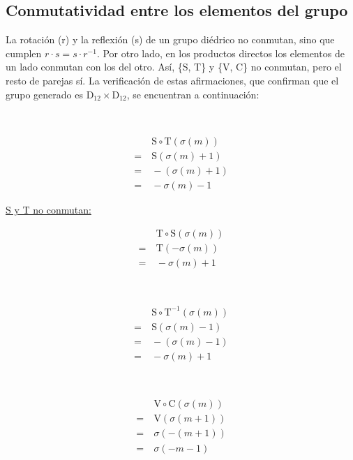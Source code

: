	\subsection{Conmutatividad entre los elementos del grupo}		
		La rotaci\'on (r) y la reflexi\'on (s) de un grupo di\'edrico no conmutan, sino que cumplen $r\cdot s=s\cdot r^{-1}$. Por otro lado, en los productos directos los elementos de un lado conmutan con los del otro. As\'i, \{S, T\} y \{V, C\} no conmutan, pero el resto de parejas s\'i. La verificaci\'on de estas afirmaciones, que confirman que el grupo generado es D$_{12}\times\mbox{D}_{12}$, se encuentran %
		a continuaci\'on:
			\begin{center}
			\begin{multicols}{3}
				\ \linebreak
				
				\begin{align*}
				&\ \text{S}\circ\text{T}(\sigma(m))\\
				=&\ \text{S}(\sigma(m)+1)\\
				=&\ -(\sigma(m)+1)\\
				=&\ -\sigma(m)-1
				\end{align*}
				
				\underline{S y T no conmutan:}
				
				\begin{align*}
				&\ \text{T}\circ\text{S}(\sigma(m))\\
				=&\ \text{T}(-\sigma(m))\\
				=&\ -\sigma(m)+1
				\end{align*}			
				
				\ \linebreak
				
				\begin{align*}
				&\ \text{S}\circ\text{T}^{-1}(\sigma(m))\\
				=&\ \text{S}(\sigma(m)-1)\\
				=&\ -(\sigma(m)-1)\\
				=&\ -\sigma(m)+1
				\end{align*}
			\end{multicols}
			
			\begin{multicols}{3}
				\ \linebreak
				
				\begin{align*}
				&\ \text{V}\circ\text{C}(\sigma(m))\\
				=&\ \text{V}(\sigma(m+1))\\
				=&\ \sigma(-(m+1))\\
				=&\ \sigma(-m-1)
				\end{align*}
				

\end{multicols}
\end{center}
